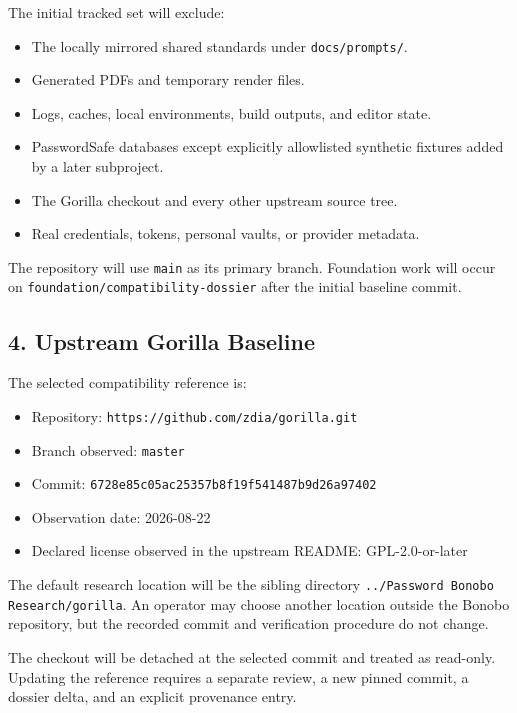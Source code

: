\documentclass[
  letterpaper,
]{article}
\newcommand{\passthrough}[1]{#1}
\providecommand{\tightlist}{%
  \setlength{\itemsep}{0pt}\setlength{\parskip}{0pt}}
\begin{document}
The initial tracked set will exclude:

\begin{itemize}
\tightlist
\item
  The locally mirrored shared standards under \nolinkurl{docs/prompts/}.
\item
  Generated PDFs and temporary render files.
\item
  Logs, caches, local environments, build outputs, and editor state.
\item
  PasswordSafe databases except explicitly allowlisted synthetic fixtures added by a later subproject.
\item
  The Gorilla checkout and every other upstream source tree.
\item
  Real credentials, tokens, personal vaults, or provider metadata.
\end{itemize}

The repository will use \passthrough{\lstinline!main!} as its primary branch. Foundation work will occur on
\nolinkurl{foundation/compatibility-dossier} after the initial baseline commit.

\subsection{4. Upstream Gorilla Baseline}\label{4-upstream-gorilla-baseline}

The selected compatibility reference is:

\begin{itemize}
\tightlist
\item
  Repository: \nolinkurl{https://github.com/zdia/gorilla.git}
\item
  Branch observed: \passthrough{\lstinline!master!}
\item
  Commit: \nolinkurl{6728e85c05ac25357b8f19f541487b9d26a97402}
\item
  Observation date: 2026-08-22
\item
  Declared license observed in the upstream README: GPL-2.0-or-later
\end{itemize}

The default research location will be the sibling directory
\passthrough{\lstinline!../Password Bonobo Research/gorilla!}. An operator may choose another location outside the
Bonobo repository, but the recorded commit and verification procedure do not change.

The checkout will be detached at the selected commit and treated as read-only. Updating the reference requires a
separate review, a new pinned commit, a dossier delta, and an explicit provenance entry.
\end{document}
